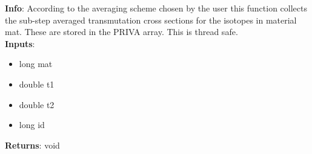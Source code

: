 \textbf{Info}: According to the averaging scheme chosen by the user this function
collects the sub-step averaged transmutation cross sections for the isotopes in 
material mat. These are stored in the PRIVA array. This is thread safe. \\

\noindent \textbf{Inputs}:
\begin{itemize}
\item{long mat}
\item{double t1}
\item{double t2}
\item{long id}
\end{itemize}

\noindent \textbf{Returns}: void

